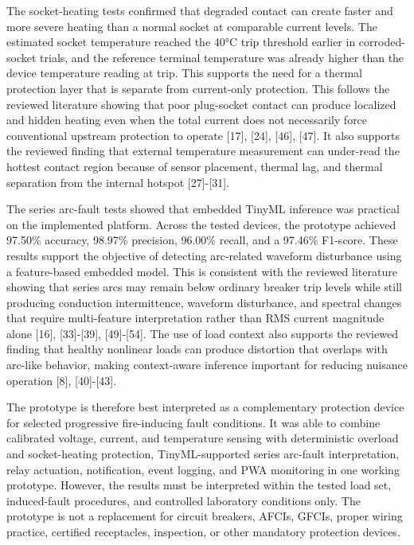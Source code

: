 The socket-heating tests confirmed that degraded contact can create faster and
more severe heating than a normal socket at comparable current levels. The
estimated socket temperature reached the 40°C trip threshold earlier in
corroded-socket trials, and the reference terminal temperature was already
higher than the device temperature reading at trip. This supports the need for a
thermal protection layer that is separate from current-only protection. This
follows the reviewed literature showing that poor plug-socket contact can
produce localized and hidden heating even when the total current does not
necessarily force conventional upstream protection to operate [17], [24],
[46], [47]. It also supports the reviewed finding that external temperature
measurement can under-read the hottest contact region because of sensor
placement, thermal lag, and thermal separation from the internal hotspot
[27]-[31].

The series arc-fault tests showed that embedded TinyML inference was practical
on the implemented platform. Across the tested devices, the prototype achieved
97.50\% accuracy, 98.97\% precision, 96.00\% recall, and a 97.46\% F1-score.
These results support the objective of detecting arc-related waveform
disturbance using a feature-based embedded model. This is consistent with the
reviewed literature showing that series arcs may remain below ordinary breaker
trip levels while still producing conduction intermittence, waveform
disturbance, and spectral changes that require multi-feature interpretation
rather than RMS current magnitude alone [16], [33]-[39], [49]-[54]. The use of
load context also supports the reviewed finding that healthy nonlinear loads can
produce distortion that overlaps with arc-like behavior, making context-aware
inference important for reducing nuisance operation [8], [40]-[43].

The prototype is therefore best interpreted as a complementary protection
device for selected progressive fire-inducing fault conditions. It was able to
combine calibrated voltage, current, and temperature sensing with deterministic
overload and socket-heating protection, TinyML-supported series arc-fault
interpretation, relay actuation, notification, event logging, and PWA monitoring
in one working prototype. However, the results must be interpreted within the
tested load set, induced-fault procedures, and controlled laboratory conditions
only. The prototype is not a replacement for circuit breakers, AFCIs, GFCIs,
proper wiring practice, certified receptacles, inspection, or other mandatory
protection devices.

